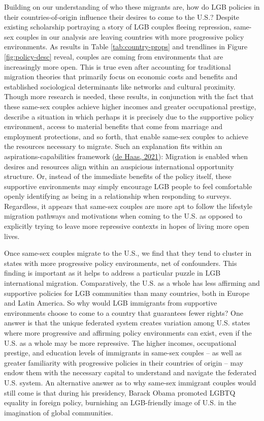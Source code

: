 \documentclass[
  11pt,
]{article}
\begin{document}
Building on our understanding of who these migrants are, how do LGB policies in their countries-of-origin influence their desires to come to the U.S.? Despite existing scholarship portraying a story of LGB couples fleeing repression, same-sex couples in our analysis are leaving countries with more progressive policy environments. As results in Table \ref{tab:country-props} and trendlines in Figure \ref{fig:policy-desc} reveal, couples are coming from environments that are increasingly more open. This is true even after accounting for traditional migration theories that primarily focus on economic costs and benefits and established sociological determinants like networks and cultural proximity. Though more research is needed, these results, in conjunction with the fact that these same-sex couples achieve higher incomes and greater occupational prestige, describe a situation in which perhaps it is precisely due to the supportive policy environment, access to material benefits that come from marriage and employment protections, and so forth, that enable same-sex couples to achieve the resources necessary to migrate. Such an explanation fits within an aspirations-capabilities framework (\protect\hyperlink{ref-dehaas_2021}{de Haas, 2021}): Migration is enabled when desires and resources align within an auspicious international opportunity structure. Or, instead of the immediate benefits of the policy itself, these supportive environments may simply encourage LGB people to feel comfortable openly identifying as being in a relationship when responding to surveys. Regardless, it appears that same-sex couples are more apt to follow the lifestyle migration pathways and motivations when coming to the U.S. as opposed to explicitly trying to leave more repressive contexts in hopes of living more open lives.

Once same-sex couples migrate to the U.S., we find that they tend to cluster in states with more progressive policy environments, net of confounders. This finding is important as it helps to address a particular puzzle in LGB international migration. Comparatively, the U.S. as a whole has less affirming and supportive policies for LGB communities than many countries, both in Europe and Latin America. So why would LGB immigrants from supportive environments choose to come to a country that guarantees fewer rights? One answer is that the unique federated system creates variation among U.S. states where more progressive and affirming policy environments can exist, even if the U.S. as a whole may be more repressive. The higher incomes, occupational prestige, and education levels of immigrants in same-sex couples -- as well as greater familiarity with progressive policies in their countries of origin -- may endow them with the necessary capital to understand and navigate the federated U.S. system. An alternative answer as to why same-sex immigrant couples would still come is that during his presidency, Barack Obama promoted LGBTQ equality in foreign policy, burnishing an LGB-friendly image of U.S. in the imagination of global communities.
\end{document}
